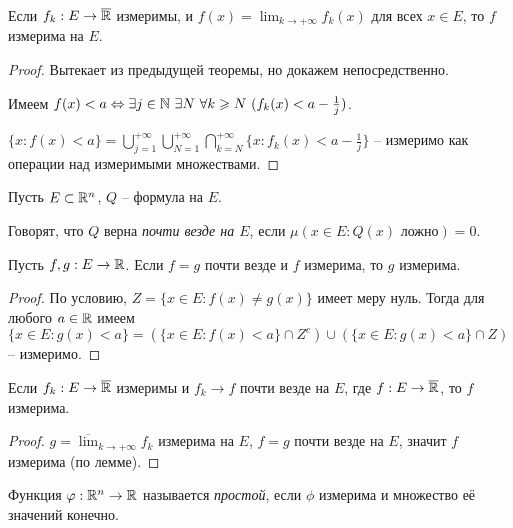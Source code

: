 \begin{corollary}
    Если $f_{k}: E \to \overline{\mathbb{R}}$ измеримы, и $f(x) = \lim_{k \to +\infty}f_{k}(x)$ для всех $x \in E$, то $f$ измерима на $E$.
\end{corollary}

\begin{proof}
    Вытекает из предыдущей теоремы, но докажем непосредственно.

    Имеем $f(x) < a \lra \exists j \in \N \ \exists N \ \forall k \geq N \ (f_{k}(x) < a - \frac{1}{j})$.

    $\{x: f(x) < a\} = \bigcup_{j = 1}^{+\infty}\bigcup_{N = 1}^{+\infty}\bigcap_{k = N}^{+\infty} \{x: f_{k}(x) < a - \frac{1}{j}\}$ -- измеримо как операции над измеримыми множествами.
\end{proof}

\begin{definition}
    Пусть $E \subset \mathbb{R}^{n}$, $Q$ -- формула на $E$.

    Говорят, что $Q$ верна \textit{почти везде на $E$}, если $\mu(x \in E: Q(x) \text{ ложно}) = 0$.
\end{definition}

\begin{lemma}
    Пусть $f, g: E \to \mathbb{R}$. Если $f = g$ почти везде и $f$ измерима, то $g$ измерима.
\end{lemma}

\begin{proof}
    По условию, $Z = \{x \in E: f(x) \neq g(x)\}$ имеет меру нуль. Тогда для любого $a \in \mathbb{R}$ имеем $\{x \in E: g(x) < a\} = (\{x \in E : f(x) < a\} \cap Z^{c})\cup(\{x \in E: g(x) < a\}\cap Z)$ -- измеримо.
\end{proof}

\begin{corollary}
    Если $f_{k}: E \to \overline{\mathbb{R}}$ измеримы и $f_{k} \to f$ почти везде на $E$, где $f: E \to \overline{\mathbb{R}}$, то $f$ измерима.
\end{corollary}

\begin{proof}
    $g = \overline{\lim}_{k \to +\infty}f_{k}$ измерима на $E$, $f = g$ почти везде на $E$, значит $f$ измерима (по лемме).
\end{proof}

\begin{definition}
    Функция $\varphi: \mathbb{R}^{n} \to \mathbb{R}$ называется \textit{простой}, если $\phi$ измерима и множество её значений конечно.
\end{definition}

